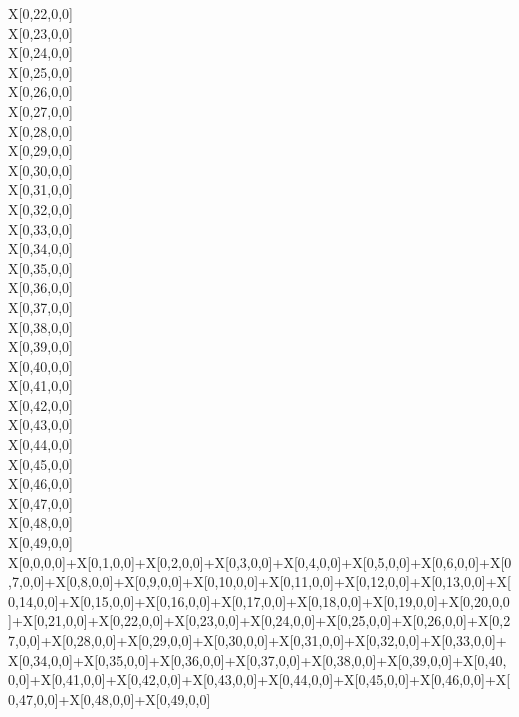 \documentclass[11pt]{article}
\begin{document}
        X[0,22,0,0] \\
        X[0,23,0,0] \\
        X[0,24,0,0] \\
        X[0,25,0,0] \\
        X[0,26,0,0] \\
        X[0,27,0,0] \\
        X[0,28,0,0] \\
        X[0,29,0,0] \\
        X[0,30,0,0] \\
        X[0,31,0,0] \\
        X[0,32,0,0] \\
        X[0,33,0,0] \\
        X[0,34,0,0] \\
        X[0,35,0,0] \\
        X[0,36,0,0] \\
        X[0,37,0,0] \\
        X[0,38,0,0] \\
        X[0,39,0,0] \\
        X[0,40,0,0] \\
        X[0,41,0,0] \\
        X[0,42,0,0] \\
        X[0,43,0,0] \\
        X[0,44,0,0] \\
        X[0,45,0,0] \\
        X[0,46,0,0] \\
        X[0,47,0,0] \\
        X[0,48,0,0] \\
        X[0,49,0,0] \\
        X[0,0,0,0]+X[0,1,0,0]+X[0,2,0,0]+X[0,3,0,0]+X[0,4,0,0]+X[0,5,0,0]+X[0,6,0,0]+X[0,7,0,0]+X[0,8,0,0]+X[0,9,0,0]+X[0,10,0,0]+X[0,11,0,0]+X[0,12,0,0]+X[0,13,0,0]+X[0,14,0,0]+X[0,15,0,0]+X[0,16,0,0]+X[0,17,0,0]+X[0,18,0,0]+X[0,19,0,0]+X[0,20,0,0]+X[0,21,0,0]+X[0,22,0,0]+X[0,23,0,0]+X[0,24,0,0]+X[0,25,0,0]+X[0,26,0,0]+X[0,27,0,0]+X[0,28,0,0]+X[0,29,0,0]+X[0,30,0,0]+X[0,31,0,0]+X[0,32,0,0]+X[0,33,0,0]+X[0,34,0,0]+X[0,35,0,0]+X[0,36,0,0]+X[0,37,0,0]+X[0,38,0,0]+X[0,39,0,0]+X[0,40,0,0]+X[0,41,0,0]+X[0,42,0,0]+X[0,43,0,0]+X[0,44,0,0]+X[0,45,0,0]+X[0,46,0,0]+X[0,47,0,0]+X[0,48,0,0]+X[0,49,0,0] \\
\end{document}
